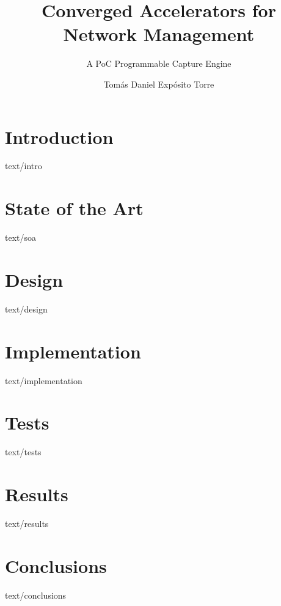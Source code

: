 \documentclass[epsbased,tfg,final,english]{tfgtfmthesisuam}
\title{Converged Accelerators for Network Management}
\subtitle{A PoC Programmable Capture Engine}
\author{Tomás Daniel Expósito Torre}
\begin{document}
\chapter{Introduction}{text/intro}
\chapter{State of the Art}{text/soa}
\chapter{Design}{text/design}
\chapter{Implementation}{text/implementation}
\chapter{Tests}{text/tests}
\chapter{Results}{text/results}
\chapter{Conclusions}{text/conclusions}
\end{document}

